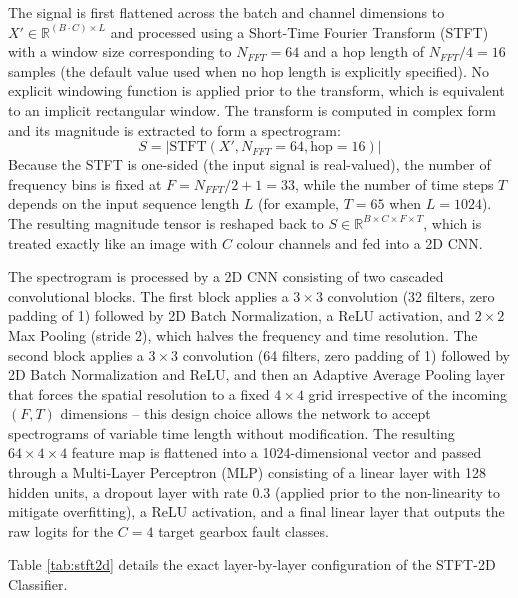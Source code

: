 \documentclass[12pt]{article}
\begin{document}
The signal is first flattened across the batch and channel dimensions to $X' \in \mathbb{R}^{(B \cdot C) \times L}$ and processed using a Short-Time Fourier Transform (STFT) with a window size corresponding to $N_{FFT} = 64$ and a hop length of $N_{FFT}/4 = 16$ samples (the default value used when no hop length is explicitly specified). No explicit windowing function is applied prior to the transform, which is equivalent to an implicit rectangular window. The transform is computed in complex form and its magnitude is extracted to form a spectrogram:
\begin{equation}
    S = |\text{STFT}(X', N_{FFT}=64, \text{hop}=16)|
\end{equation}
Because the STFT is one-sided (the input signal is real-valued), the number of frequency bins is fixed at $F = N_{FFT}/2 + 1 = 33$, while the number of time steps $T$ depends on the input sequence length $L$ (for example, $T=65$ when $L=1024$). The resulting magnitude tensor is reshaped back to $S \in \mathbb{R}^{B \times C \times F \times T}$, which is treated exactly like an image with $C$ colour channels and fed into a 2D CNN.

The spectrogram is processed by a 2D CNN consisting of two cascaded convolutional blocks. The first block applies a $3\times3$ convolution (32 filters, zero padding of 1) followed by 2D Batch Normalization, a ReLU activation, and $2\times2$ Max Pooling (stride 2), which halves the frequency and time resolution. The second block applies a $3\times3$ convolution (64 filters, zero padding of 1) followed by 2D Batch Normalization and ReLU, and then an Adaptive Average Pooling layer that forces the spatial resolution to a fixed $4\times4$ grid irrespective of the incoming $(F,T)$ dimensions -- this design choice allows the network to accept spectrograms of variable time length without modification. The resulting $64\times4\times4$ feature map is flattened into a 1024-dimensional vector and passed through a Multi-Layer Perceptron (MLP) consisting of a linear layer with 128 hidden units, a dropout layer with rate 0.3 (applied prior to the non-linearity to mitigate overfitting), a ReLU activation, and a final linear layer that outputs the raw logits for the $C=4$ target gearbox fault classes.

Table \ref{tab:stft2d} details the exact layer-by-layer configuration of the STFT-2D Classifier.
\end{document}

